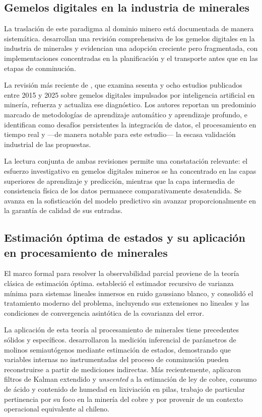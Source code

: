 \subsection{Gemelos digitales en la industria de minerales}

La traslación de este paradigma al dominio minero está documentada de manera
sistemática. \textcite{qu2023} desarrollan una revisión comprehensiva de los
gemelos digitales en la industria de minerales y evidencian una adopción
creciente pero fragmentada, con implementaciones concentradas en la
planificación y el transporte antes que en las etapas de conminución.

La revisión más reciente de \textcite{ebad2026}, que examina sesenta y ocho
estudios publicados entre 2015 y 2025 sobre gemelos digitales impulsados por
inteligencia artificial en minería, refuerza y actualiza ese diagnóstico. Los
autores reportan un predominio marcado de metodologías de aprendizaje automático
y aprendizaje profundo, e identifican como desafíos persistentes la integración
de datos, el procesamiento en tiempo real y —de manera notable para este
estudio— la escasa validación industrial de las propuestas.

La lectura conjunta de ambas revisiones permite una constatación relevante: el
esfuerzo investigativo en gemelos digitales mineros se ha concentrado en las
capas superiores de aprendizaje y predicción, mientras que la capa intermedia de
consistencia física de los datos permanece comparativamente desatendida. Se
avanza en la sofisticación del modelo predictivo sin avanzar proporcionalmente
en la garantía de calidad de sus entradas.

\subsection{Estimación óptima de estados y su aplicación en procesamiento de
minerales}

El marco formal para resolver la observabilidad parcial proviene de la teoría
clásica de estimación óptima. \textcite{kalman1960} estableció el estimador
recursivo de varianza mínima para sistemas lineales inmersos en ruido gaussiano
blanco, y \textcite{simon2006} consolidó el tratamiento moderno del problema,
incluyendo sus extensiones no lineales y las condiciones de convergencia
asintótica de la covarianza del error.

La aplicación de esta teoría al procesamiento de minerales tiene precedentes
sólidos y específicos. \textcite{apelt2002} desarrollaron la medición inferencial
de parámetros de molinos semiautógenos mediante estimación de estados,
demostrando que variables internas no instrumentadas del proceso de conminución
pueden reconstruirse a partir de mediciones indirectas. Más recientemente,
\textcite{barzaga2025} aplicaron filtros de Kalman extendido y \emph{unscented}
a la estimación de ley de cobre, consumo de ácido y contenido de humedad en
lixiviación en pilas, trabajo de particular pertinencia por su foco en la
minería del cobre y por provenir de un contexto operacional equivalente al
chileno.


